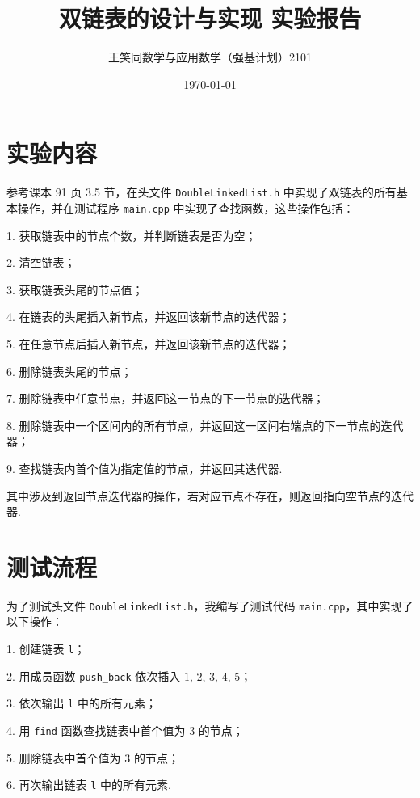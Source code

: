 \documentclass[UTF8]{ctexart}
\title{\vspace*{-2cm}双链表的设计与实现 实验报告}
\author{王笑同\quad 数学与应用数学（强基计划）2101\quad 3210105450}
\date{\today}
\begin{document}
\maketitle

\section{实验内容}

参考课本 91 页 3.5 节，在头文件 \verb|DoubleLinkedList.h| 中实现了双链表的所有基本操作，并在测试程序 \verb|main.cpp| 中实现了查找函数，这些操作包括：

\begin{tcolorbox}[pikachu]
    1. 获取链表中的节点个数，并判断链表是否为空；

    2. 清空链表；

    3. 获取链表头尾的节点值；

    4. 在链表的头尾插入新节点，并返回该新节点的迭代器；

    5. 在任意节点后插入新节点，并返回该新节点的迭代器；

    6. 删除链表头尾的节点；

    7. 删除链表中任意节点，并返回这一节点的下一节点的迭代器；

    8. 删除链表中一个区间内的所有节点，并返回这一区间右端点的下一节点的迭代器；

    9. 查找链表内首个值为指定值的节点，并返回其迭代器.
\end{tcolorbox}

其中涉及到返回节点迭代器的操作，若对应节点不存在，则返回指向空节点的迭代器.

\section{测试流程}

为了测试头文件 \verb|DoubleLinkedList.h|，我编写了测试代码 \verb|main.cpp|，其中实现了以下操作：

\begin{tcolorbox}[pikachu]
    1. 创建链表 \verb|l|；

    2. 用成员函数 \verb|push_back| 依次插入 $1,\,2,\,3,\,4,\,5$；

    3. 依次输出 \verb|l| 中的所有元素；

    4. 用 \verb|find| 函数查找链表中首个值为 $3$ 的节点；

    5. 删除链表中首个值为 $3$ 的节点；

    6. 再次输出链表 \verb|l| 中的所有元素.
\end{tcolorbox}
\end{document}

